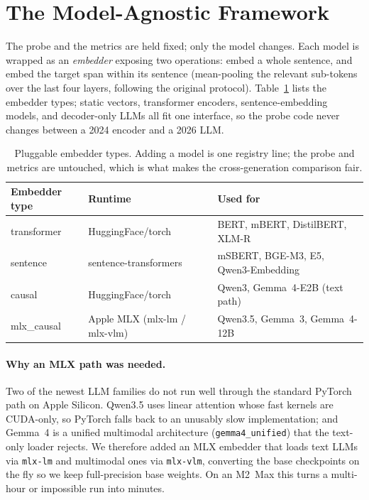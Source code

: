 \documentclass[11pt]{article}
\begin{document}
\section{The Model-Agnostic Framework}
\label{sec:framework}

The probe and the metrics are held fixed; only the model changes. Each model is wrapped as an
\emph{embedder} exposing two operations: embed a whole sentence, and embed the target span within
its sentence (mean-pooling the relevant sub-tokens over the last four layers, following the original
protocol). Table~\ref{tab:embedders} lists the embedder types; static vectors, transformer encoders,
sentence-embedding models, and decoder-only LLMs all fit one interface, so the probe code never
changes between a 2024 encoder and a 2026 LLM.

\begin{table}[H]
\centering
\small
\begin{tabular}{lll}
\toprule
Embedder type & Runtime & Used for \\
\midrule
transformer & HuggingFace/torch & BERT, mBERT, DistilBERT, XLM-R \\
sentence & sentence-transformers & mSBERT, BGE-M3, E5, Qwen3-Embedding \\
causal & HuggingFace/torch & Qwen3, Gemma~4-E2B (text path) \\
mlx\_causal & Apple MLX (mlx-lm / mlx-vlm) & Qwen3.5, Gemma~3, Gemma~4-12B \\
\bottomrule
\end{tabular}
\caption{Pluggable embedder types. Adding a model is one registry line; the probe and metrics are
untouched, which is what makes the cross-generation comparison fair.}
\label{tab:embedders}
\end{table}

\paragraph{Why an MLX path was needed.} Two of the newest LLM families do not run well through the
standard PyTorch path on Apple Silicon. Qwen3.5 uses linear attention whose fast kernels are
CUDA-only, so PyTorch falls back to an unusably slow implementation; and Gemma~4 is a unified
multimodal architecture (\texttt{gemma4\_unified}) that the text-only loader rejects. We therefore
added an MLX embedder that loads text LLMs via \texttt{mlx-lm} and multimodal ones via
\texttt{mlx-vlm}, converting the base checkpoints on the fly so we keep full-precision base weights.
On an M2~Max this turns a multi-hour or impossible run into minutes.
\end{document}
